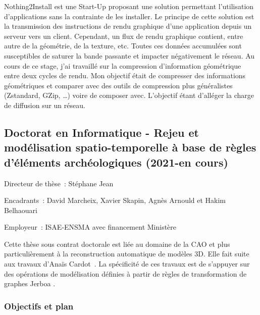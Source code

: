 \documentclass[11pt,a4paper,oneside]{article}
\begin{document}
Nothing2Install est une Start-Up proposant une solution permettant l'utilisation
d'applications sans la contrainte de les installer. %
Le principe de cette solution est la transmission des instructions de rendu
graphique d'une application depuis un serveur vers un client. %
Cependant, un flux de rendu graphique contient, entre autre de la géométrie, de
la texture, etc. %
Toutes ces données accumulées sont susceptibles de saturer la bande passante et
impacter négativement le réseau. %
Au cours de ce stage, j'ai travaillé sur la compression d'information
géométrique entre deux cycles de rendu. %
Mon objectif était de compresser des informations géométriques et comparer avec
des outils de compression plus généralistes (Zstandard, GZip, …) voire de
composer avec. %
L'objectif étant d'alléger la charge de diffusion sur un réseau. %

\subsection{Doctorat en Informatique - Rejeu et modélisation spatio-temporelle à base de règles d'éléments archéologiques  (2021-en cours)}

\noindent Directeur de thèse~: Stéphane Jean

\noindent Encadrants~: \tabto{2.26cm} David Marcheix, Xavier Skapin, Agnès Arnould et Hakim Belhaouari

\noindent Employeur~: ISAE-ENSMA avec financement Ministère

Cette thèse sous contrat doctorale est liée au domaine de la CAO et plus
particulièrement à la reconstruction automatique de modèles 3D. %
Elle fait suite aux travaux d'Anaïs Cardot~\cite{cardot2019}.
La spécificité de ces travaux est de s'appuyer sur des opérations de
modélisation définies à partir de règles de transformation de graphes Jerboa \cite{belhaouari2014jerboa}. %

\subsubsection{Objectifs et plan}
\end{document}
